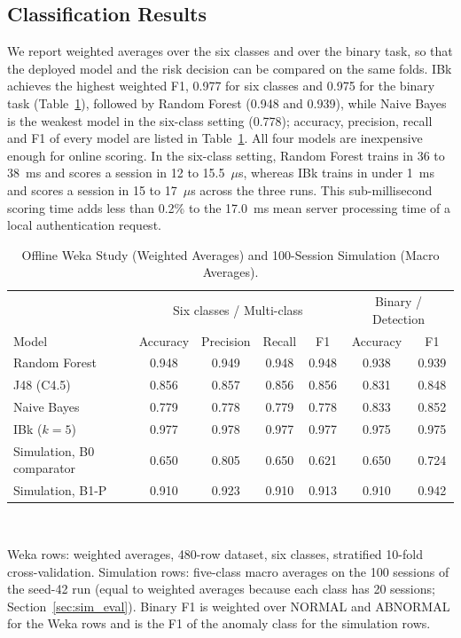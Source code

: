 \documentclass[journal,onecolumn]{IEEEtran}
\begin{document}
\subsection{Classification Results}

We report weighted averages over the six classes and over the binary task, so that the deployed model and the risk
decision can be compared on the same folds. IBk achieves the highest weighted F1, 0.977 for six classes and 0.975 for
the binary task (Table~\ref{tab:ml}), followed by Random Forest (0.948 and 0.939), while Naive Bayes is the weakest
model in the six-class setting (0.778); accuracy, precision, recall and F1 of every model are listed in
Table~\ref{tab:ml}. All four models are inexpensive enough for online scoring. In the six-class setting, Random Forest
trains in 36 to 38~ms and scores a session in 12 to 15.5~$\mu$s, whereas IBk trains in under 1~ms and scores a session
in 15 to 17~$\mu$s across the three runs. This sub-millisecond scoring time adds less than 0.2\% to the 17.0~ms mean
server processing time of a local authentication request.

\begin{table}[!htbp]
\renewcommand{\arraystretch}{1.04}
\centering
\small
\caption{Offline Weka Study (Weighted Averages) and 100-Session Simulation (Macro Averages).}
\label{tab:ml}
\vspace{4pt}
\begin{tabular}{l c c c c c c}
\hline
 & \multicolumn{4}{c}{Six classes / Multi-class} & \multicolumn{2}{c}{Binary / Detection} \\
Model & Accuracy & Precision & Recall & F1 & Accuracy & F1 \\
\hline
\rule{0pt}{2.6ex}Random Forest & 0.948 & 0.949 & 0.948 & 0.948 & 0.938 & 0.939 \\
J48 (C4.5)    & 0.856 & 0.857 & 0.856 & 0.856 & 0.831 & 0.848 \\
Naive Bayes   & 0.779 & 0.778 & 0.779 & 0.778 & 0.833 & 0.852 \\
IBk ($k=5$)   & 0.977 & 0.978 & 0.977 & 0.977 & 0.975 & 0.975 \\
\hline
\rule{0pt}{2.6ex}Simulation, B0 comparator & 0.650 & 0.805 & 0.650 & 0.621 & 0.650 & 0.724 \\
Simulation, B1-P & 0.910 & 0.923 & 0.910 & 0.913 & 0.910 & 0.942 \\
\hline
\end{tabular}
\\[2pt]
\parbox{0.92\linewidth}{\footnotesize Weka rows: weighted averages, 480-row dataset, six classes, stratified 10-fold
cross-validation. Simulation rows: five-class macro averages on the 100 sessions of the seed-42 run (equal to weighted
averages because each class has 20 sessions; Section~\ref{sec:sim_eval}). Binary F1 is weighted over NORMAL and
ABNORMAL for the Weka rows and is the F1 of the anomaly class for the simulation rows.}
\end{table}
\end{document}
